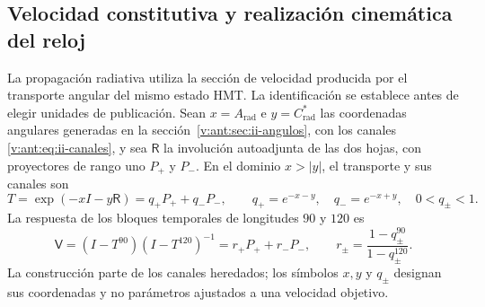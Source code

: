 \subsection{Velocidad constitutiva y realización cinemática del reloj}
\label{v:sec:enlace-velocidad-constitutiva}

La propagación radiativa utiliza la sección de velocidad producida por el
transporte angular del mismo estado HMT. La identificación se establece
antes de elegir unidades de publicación. Sean $x=A_{\mathrm{rad}}$ e
$y=C^*_{\mathrm{rad}}$ las coordenadas angulares generadas en la
sección~\ref{v:ant:sec:ii-angulos}, con los canales
\eqref{v:ant:eq:ii-canales}, y sea
$\mathsf R$ la involución autoadjunta de las dos hojas, con proyectores
de rango uno $P_+$ y $P_-$. En el dominio $x>|y|$, el transporte y sus
canales son
\begin{equation}
 T=\exp(-xI-y\mathsf R)=q_+P_++q_-P_-,
 \qquad q_+=e^{-x-y},\quad q_-=e^{-x+y},\quad 0<q_\pm<1.
 \label{v:eq:velocidad-transporte}
\end{equation}
La respuesta de los bloques temporales de longitudes $90$ y $120$ es
\begin{equation}
 \mathsf V=(I-T^{90})(I-T^{120})^{-1}
       =r_+P_++r_-P_-,\qquad
 r_\pm=\frac{1-q_\pm^{90}}{1-q_\pm^{120}}.
 \label{v:eq:velocidad-respuesta}
\end{equation}
La construcción parte de los canales heredados; los símbolos $x,y$ y
$q_\pm$ designan sus coordenadas y no parámetros ajustados a una velocidad
objetivo.

